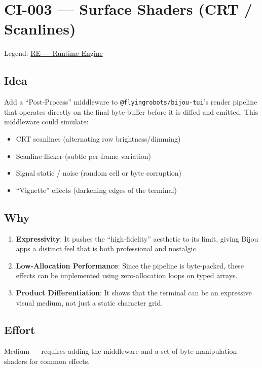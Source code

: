 \chapter{CI-003 --- Surface Shaders (CRT / Scanlines)}\label{record-287}

\smallskip

Legend: \href{https://github.com/flyingrobots/bijou/blob/cbd70612140e7a450d764b3c7be1c6af878b99bc/docs/method/graveyard/legends/RE-runtime-engine.md}{RE --- Runtime Engine}

\section{Idea}\label{record-287-idea}

Add a ``Post-Process'' middleware to \texttt{@\allowbreak{}f\allowbreak{}l\allowbreak{}y\allowbreak{}i\allowbreak{}n\allowbreak{}g\allowbreak{}r\allowbreak{}o\allowbreak{}b\allowbreak{}o\allowbreak{}t\allowbreak{}s\allowbreak{}/\allowbreak{}b\allowbreak{}i\allowbreak{}j\allowbreak{}o\allowbreak{}u\allowbreak{}-\allowbreak{}t\allowbreak{}u\allowbreak{}i}'s render pipeline that operates directly on the final byte-buffer before it is diffed and emitted. This middleware could simulate:

\begin{itemize}
\tightlist
\item
  CRT scanlines (alternating row brightness/dimming)
\item
  Scanline flicker (subtle per-frame variation)
\item
  Signal static / noise (random cell or byte corruption)
\item
  ``Vignette'' effects (darkening edges of the terminal)
\end{itemize}

\section{Why}\label{record-287-why}

\begin{enumerate}
\def\labelenumi{\arabic{enumi}.}
\tightlist
\item
  \textbf{Expressivity}: It pushes the ``high-fidelity'' aesthetic to its limit, giving Bijou apps a distinct feel that is both professional and nostalgic.
\item
  \textbf{Low-Allocation Performance}: Since the pipeline is byte-packed, these effects can be implemented using zero-allocation loops on typed arrays.
\item
  \textbf{Product Differentiation}: It shows that the terminal can be an expressive visual medium, not just a static character grid.
\end{enumerate}

\section{Effort}\label{record-287-effort}

Medium --- requires adding the middleware and a set of byte-manipulation shaders for common effects.

